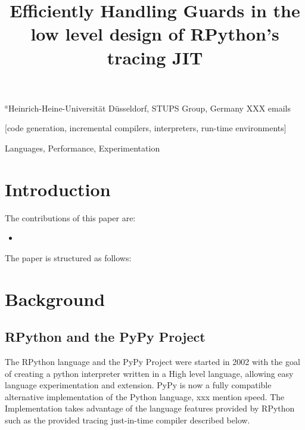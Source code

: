 \documentclass[10pt]{sigplanconf}
\begin{document}
\title{Efficiently Handling Guards in the low level design of RPython's tracing JIT}

           {$^a$Heinrich-Heine-Universität Düsseldorf, STUPS Group, Germany
           }
           {XXX emails}

\crdata{}

\maketitle

[code generation,
incremental compilers, interpreters, run-time environments]

\terms
Languages, Performance, Experimentation


\begin{abstract}

\end{abstract}


\section{Introduction}


The contributions of this paper are:
\begin{itemize}
 \item
\end{itemize}

The paper is structured as follows:

\section{Background}
\label{sec:Background}

\subsection{RPython and the PyPy Project}
\label{sub:pypy}


The RPython language and the PyPy Project were started in 2002 with the goal of
creating a python interpreter written in a High level language, allowing easy
language experimentation and extension. PyPy is now a fully compatible
alternative implementation of the Python language, xxx mention speed. The
Implementation takes advantage of the language features provided by RPython
such as the provided tracing just-in-time compiler described below.
\end{document}
